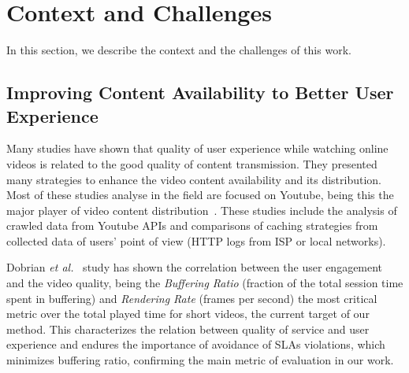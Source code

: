 \section{Context and Challenges}
\label{sec:context}


In this section, we describe the context and the challenges of this
work.

\subsection{Improving Content Availability to Better
User Experience}

Many studies have shown that quality of user experience while watching
online videos is related to the good quality of content transmission.
They presented many strategies to
enhance the video content availability and its distribution.  Most of these studies analyse in the field are focused on Youtube, being
this the major player of video content
distribution~\cite{youtube_wsdm_2011,Adhikari_infocom_2012,Brodersen_www_2012,Braun_noms_2012}. These studies include the analysis of crawled data from Youtube APIs and comparisons of
caching strategies from collected data of users' point of view (HTTP
logs from ISP or local networks).

Dobrian \emph{et al.}~\cite{Dobrian_sigcomm_2011} study has shown the
correlation between the user engagement and the video quality, being
the \emph{Buffering Ratio} (fraction of the total session time spent
in buffering) and \emph{Rendering Rate} (frames per second) the most
critical metric over the total played time for short videos, the
current target of our method. This characterizes the relation between
quality of service and user experience and endures the importance of
avoidance of SLAs violations, which minimizes buffering ratio,
confirming the main metric of  evaluation in our work. 

